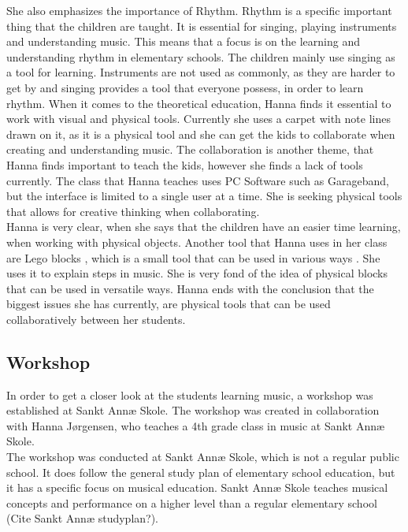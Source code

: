 She also emphasizes the importance of Rhythm. Rhythm is a specific important thing that the children are taught. It is essential for singing, playing instruments and understanding music. This means that a focus is on the learning and understanding rhythm in elementary schools. The children mainly use singing as a tool for learning. Instruments are not used as commonly, as they are harder to get by and singing provides a tool that everyone possess, in order to learn rhythm. When it comes to the theoretical education, Hanna finds it essential to work with visual and physical tools. Currently  she uses a carpet with note lines drawn on it, as it is a physical tool and she can get the kids to collaborate when creating and understanding music. The collaboration is another theme, that Hanna finds important to teach the kids, however she finds a lack of tools currently. The class that Hanna teaches uses PC Software such as Garageband, but the interface is limited to a single user at a time. She is seeking physical tools that allows for creative thinking when collaborating. \\

Hanna is very clear, when she says that the children have an easier time learning, when working with physical objects. Another tool that Hanna uses in her class are Lego blocks , which is a small tool that can be used in various ways . She uses it to explain steps in music. She is very fond of the idea of physical blocks that can be used in versatile ways.
Hanna ends with the conclusion that the biggest issues she has currently, are physical tools that can be used collaboratively between her students.\\


\subsection{Workshop}\label{sec:workshop}
In order to get a closer look at the students learning music, a workshop was established at Sankt Annæ Skole. The workshop was created in collaboration with Hanna Jørgensen, who teaches a 4th grade class in music at Sankt Annæ Skole.\\

The workshop was conducted at Sankt Annæ Skole, which is not a regular public school. It does follow the general study plan of elementary school education, but it has a specific focus on musical education. Sankt Annæ Skole teaches musical concepts and performance on a higher level than a regular elementary school (Cite Sankt Annæ studyplan?). \\


